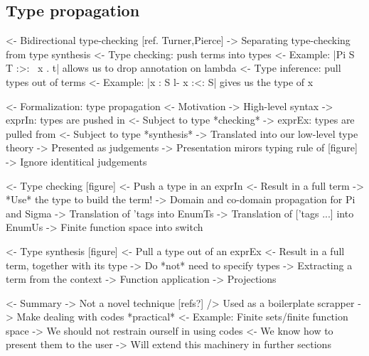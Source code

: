 \documentclass{article}
\newenvironment{structure}{\footnotesize\verbatim}{\endverbatim}
\begin{document}
\subsection{Type propagation}

\begin{structure}
<- Bidirectional type-checking [ref. Turner,Pierce]
    -> Separating type-checking from type synthesis
    <- Type checking: push terms into types
        <- Example: |Pi S T :>: \ x . t| allows us to drop annotation on lambda
    <- Type inference: pull types out of terms
        <- Example: |x : S l- x :<: S| gives us the type of x
\end{structure}

\begin{structure}
<- Formalization: type propagation
    <- Motivation
        -> High-level syntax
            -> exprIn: types are pushed in
                <- Subject to type *checking*
            -> exprEx: types are pulled from
                <- Subject to type *synthesis*
        -> Translated into our low-level type theory
        -> Presented as judgements
    -> Presentation mirors typing rule of [figure] 
        -> Ignore identitical judgements
\end{structure}

\begin{structure}
<- Type checking [figure]
    <- Push a type in an exprIn
    <- Result in a full term
    -> *Use* the type to build the term!
        -> Domain and co-domain propagation for Pi and Sigma
        -> Translation of 'tags into EnumTs
        -> Translation of ['tags ...] into EnumUs
        -> Finite function space into switch
\end{structure}

\begin{structure}
<- Type synthesis [figure]
    <- Pull a type out of an exprEx
    <- Result in a full term, together with its type
    -> Do *not* need to specify types
        -> Extracting a term from the context
        -> Function application
        -> Projections
\end{structure}

\begin{structure}
<- Summary
    -> Not a novel technique [refs?]
        /> Used as a boilerplate scrapper
    -> Make dealing with codes *practical*
        <- Example: Finite sets/finite function space
        -> We should not restrain ourself in using codes
            <- We know how to present them to the user
-> Will extend this machinery in further sections
\end{structure}
\end{document}
